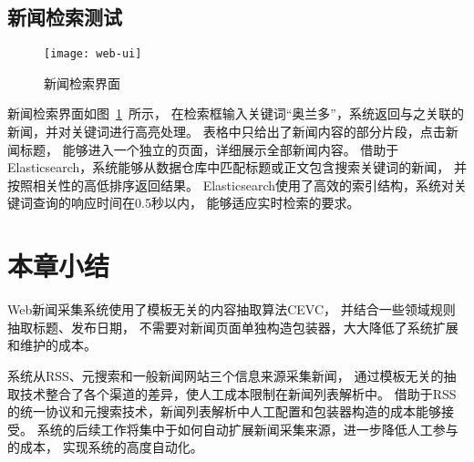 \subsection{新闻检索测试}

\begin{figure}[htbp]
\centering
\texttt{[image: web-ui]}
\caption{新闻检索界面}
\label{fig:web-ui}
\end{figure}

新闻检索界面如图~\ref{fig:web-ui}~所示，
在检索框输入关键词“奥兰多”，系统返回与之关联的新闻，并对关键词进行高亮处理。
表格中只给出了新闻内容的部分片段，点击新闻标题，
能够进入一个独立的页面，详细展示全部新闻内容。
借助于Elasticsearch，系统能够从数据仓库中匹配标题或正文包含搜索关键词的新闻，
并按照相关性的高低排序返回结果。
Elasticsearch使用了高效的索引结构，系统对关键词查询的响应时间在0.5秒以内，
能够适应实时检索的要求。

\section{本章小结}
\label{sec:system-conclusion}

Web新闻采集系统使用了模板无关的内容抽取算法CEVC，
并结合一些领域规则抽取标题、发布日期，
不需要对新闻页面单独构造包装器，大大降低了系统扩展和维护的成本。

系统从RSS、元搜索和一般新闻网站三个信息来源采集新闻，
通过模板无关的抽取技术整合了各个渠道的差异，使人工成本限制在新闻列表解析中。
借助于RSS的统一协议和元搜索技术，新闻列表解析中人工配置和包装器构造的成本能够接受。
系统的后续工作将集中于如何自动扩展新闻采集来源，进一步降低人工参与的成本，
实现系统的高度自动化。

